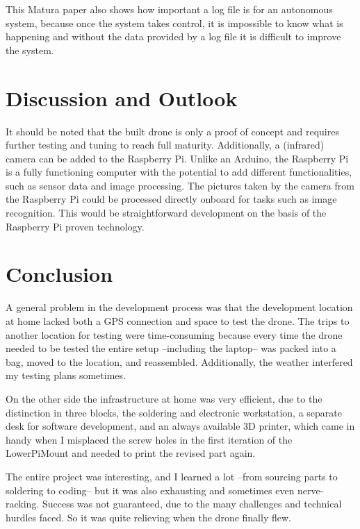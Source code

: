 \documentclass[svgnames]{article}
\begin{document}
	This Matura paper also shows how important a log file is for an autonomous system, because once the system takes  control, it is impossible to know what is happening and without the data provided by a log file it is difficult to improve the system.
	
	\section{Discussion and Outlook}
	 It should be noted that the built drone is only a proof of concept and requires further testing and tuning to reach full maturity. Additionally, a (infrared) camera can be added to the Raspberry Pi. Unlike an Arduino, the Raspberry Pi is a fully functioning computer with the potential to add different functionalities, such as sensor data and image processing. The pictures taken by the camera from the Raspberry Pi could be processed directly onboard for tasks such as image recognition. This would be straightforward development on the basis of the Raspberry Pi proven technology.
	
	
	\section{Conclusion}
	A general problem in the development process was that the development location at home lacked both a \gls{GPS} connection and space to test the drone. The trips to another location for testing were time-consuming because every time the drone needed to be tested the entire setup  --including the laptop-- was packed into a bag, moved to the location, and reassembled. Additionally, the weather interfered my testing plans sometimes.
	
	On the other side the infrastructure at home was very efficient, due to the distinction in three blocks, the soldering and electronic workstation, a separate desk for software development, and an always available 3D printer, which came in handy when I misplaced the screw holes in the first iteration of the LowerPiMount and needed to print the revised part again.
	
	The entire project was interesting, and I learned a lot --from sourcing parts to soldering to coding-- but it was also exhausting and sometimes even nerve-racking. Success was not guaranteed, due to the many challenges and technical hurdles faced. So it was quite relieving when the drone finally flew.
	

	
	\newpage
	\renewcommand{\thesubsection}{\Alph{subsection}}
	\pagebreak
	\appendix
\end{document}
